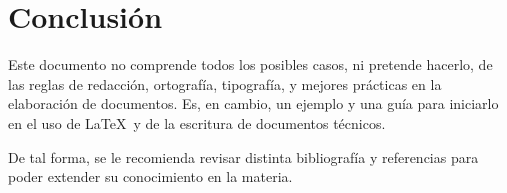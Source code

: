 \documentclass[twocolumn,11pts]{IEEEtran}
\begin{document}
\section{Conclusión}
Este documento no comprende todos los posibles casos, ni pretende hacerlo, de las reglas de redacción, ortografía, tipografía, y mejores prácticas en la elaboración de documentos. Es, en cambio, un ejemplo y una guía para iniciarlo en el uso de \LaTeX\ y de la escritura de documentos técnicos. 

De tal forma, se le recomienda revisar distinta bibliografía y referencias para poder extender su conocimiento en la materia.





\end{document}
